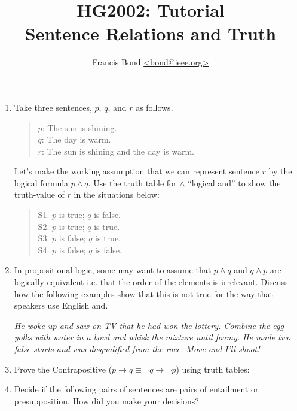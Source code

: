 \documentclass[a4paper]{article}
\title{\vspace*{-30mm}HG2002: Tutorial \\  Sentence Relations and Truth}
\author{Francis Bond \url{<bond@ieee.org>}}
\date{}%
\newcommand{\ix}{\ex\it}
\begin{document}
\maketitle

\begin{enumerate}
\item Take three sentences, $p$, $q$, and $r$ as follows. 

  \begin{quotation}
    \noindent $p$: The sun is shining. \\
    $q$: The day is warm. \\
    $r$: The sun is shining and the day is warm. 
  \end{quotation}

  Let’s make the working assumption that we can represent sentence $r$
  by the logical formula $p \wedge q$. Use the truth table for $\wedge$ ``logical and'' to
  show the truth-value of $r$ in the situations below:
  \begin{quotation}
    \noindent S1. $p$ is true; $q$ is false.\\
    S2. $p$ is true; $q$ is true.\\
    S3. $p$ is false; $q$ is true. \\
    S4. $p$ is false; $q$ is false.
  \end{quotation}

\item  In propositional logic, some may want to assume that $p \wedge q$ and 
$q \wedge p$ are logically
equivalent i.e. that the order of the elements is irrelevant. Discuss how the following
examples show that this is not true for the way that speakers use English and. 
\begin{exe}
  \ix He woke up and saw on TV that he had won the lottery. 
  \ix Combine the egg yolks with water in a bowl and whisk the mixture until 
  foamy.
  \ix  He made two false starts and was disqualified from the race.
  \ix Move and I'll shoot! 
\end{exe}

\item Prove the Contrapositive ($p \rightarrow q \equiv \neg q \rightarrow \neg p$) using truth tables:

\item  Decide if the following pairs of sentences are pairs of entailment or 
presupposition. How did you make your decisions? 


\end{enumerate}
\end{document}
